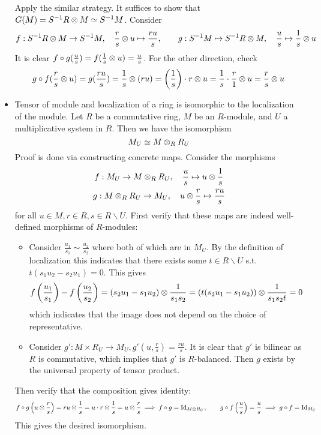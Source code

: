 \documentclass{article}
\begin{document}
\begin{example}
\begin{itemize}
        Apply the similar strategy. It suffices to show that $G(M) = S^{-1}R \otimes M \simeq S^{-1}M$. Consider
        \[
            f: S^{-1}R \otimes M \to S^{-1}M, \quad \frac{r}{s} \otimes u \mapsto \frac{ru}{s}, \qquad g: S^{-1}M \mapsto S^{-1}R \otimes M, \quad \frac{u}{s} \mapsto \frac{1}{s} \otimes u
        \]
        It is clear $f \circ g(\frac{u}{s}) = f(\frac{1}{s} \otimes u) = \frac{u}{s}$. For the other direction, check
        \[
            g \circ f (\frac{r}{s} \otimes u) = g(\frac{ru}{s}) = \frac{1}{s} \otimes (ru) = \left(\frac{1}{s}\right)\cdot r \otimes u = \frac{1}{s} \cdot \frac{r}{1} \otimes u = \frac{r}{s} \otimes u
        \]
        \item Tensor of module and localization of a ring is isomorphic to the localization of the module. Let $R$ be a commutative ring, $M$ be an $R$-module, and $U$ a multiplicative system in $R$. Then we have the isomorphism
        \[
            M_U \simeq M \otimes_R R_U
        \]
        Proof is done via constructing concrete maps. Consider the morphisms
        \[
            \begin{array}{c}
                f: M_U \to M \otimes_R R_U, \quad \dfrac{u}{s} \mapsto u \otimes \dfrac{1}{s} \\[8pt]
                g: M \otimes_R R_U \to M_U, \quad u \otimes \dfrac{r}{s} \mapsto \dfrac{ru}{s}
            \end{array}
        \]
        for all $u \in M, r \in R, s \in R\smallsetminus U$. First verify that these maps are indeed well-defined morphisms of $R$-modules:
        \begin{itemize}
            \item Consider $\frac{u_1}{s_1} \sim \frac{u_2}{s_2}$ where both of which are in $M_U$. By the definition of localization this indicates that there exists some $t \in R \smallsetminus U$ s.t. $t(s_1 u_2 - s_2 u_1) = 0$. This gives
            \[
                f\left( \frac{u_1}{s_1} \right) - f\left( \frac{u_2}{s_2} \right) = (s_2 u_1 - s_1 u_2) \otimes \frac{1}{s_1 s_2} = (t(s_2 u_1 - s_1 u_2)) \otimes \frac{1}{s_1 s_2 t} = 0
            \]
            which indicates that the image does not depend on the choice of representative.
            \item Consider $g': M \times R_U \to M_U, g'(u, \frac{r}{s}) = \frac{ru}{s}$. It is clear that $g'$ is bilinear as $R$ is commutative, which implies that $g'$ is $R$-balanced. Then $g$ exists by the universal property of tensor product.
        \end{itemize} 
        Then verify that the composition gives identity:
        \[
            f \circ g \left(u \otimes \frac{r}{s}\right) = ru \otimes \frac{1}{s} = u \cdot r \otimes \frac{1}{s} = u \otimes \frac{r}{s} \implies f \circ g = \mathrm{Id}_{M \otimes R_U}, \qquad
            g \circ f \left(\frac{u}{s}\right) = \frac{u}{s} \implies g \circ f = \mathrm{Id}_{M_U}
        \]
        This gives the desired isomorphism.
    \end{itemize}
\end{example}
\end{document}
